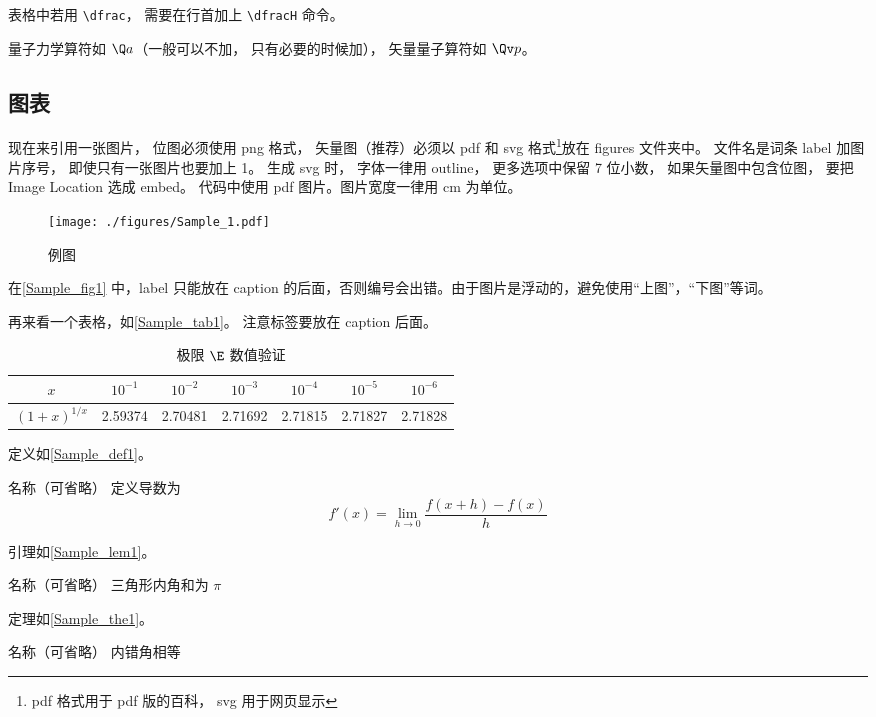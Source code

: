 表格中若用 \lstinline|\dfrac|， 需要在行首加上 \lstinline|\dfracH| 命令。%

量子力学算符如 $\Q a$（一般可以不加， 只有必要的时候加）， 矢量量子算符如 $\Qv p$。

\subsection{图表}

现在来引用一张图片， 位图必须使用 png 格式， 矢量图（推荐）必须以 pdf 和 svg 格式\footnote{pdf 格式用于 pdf 版的百科， svg 用于网页显示}放在 figures 文件夹中。 文件名是词条 label 加图片序号， 即使只有一张图片也要加上 1。 生成 svg 时， 字体一律用 outline， 更多选项中保留 7 位小数， 如果矢量图中包含位图， 要把 Image Location 选成 embed。 代码中使用 pdf 图片。图片宽度一律用 cm 为单位。
\begin{figure}[ht]
\centering
\texttt{[image: ./figures/Sample\_1.pdf]}
\caption{例图} \label{Sample_fig1}
\end{figure}
在\autoref{Sample_fig1} 中，label 只能放在 caption 的后面，否则编号会出错。由于图片是浮动的，避免使用“上图”，“下图”等词。

再来看一个表格，如\autoref{Sample_tab1}。 注意标签要放在 caption 后面。
\begin{table}[ht]
\centering
\caption{极限 $\E$ 数值验证}\label{Sample_tab1}
\begin{tabular}{|c|c|c|c|c|c|c|}
\hline
$x$ & ${10^{ - 1}}$ & ${10^{ - 2}}$ & ${10^{ - 3}}$ & ${10^{ - 4}}$ & ${10^{ - 5}}$ & ${10^{ - 6}}$ \\
\hline
$(1 + x)^{1/x}$ & 2.59374 & 2.70481 & 2.71692 & 2.71815 & 2.71827 & 2.71828 \\
\hline
\end{tabular}
\end{table}

定义如\autoref{Sample_def1}。
\begin{definition}{名称（可省略）}\label{Sample_def1}
 定义导数为
\begin{equation}
f'(x) = \lim_{h \to 0} \frac{f(x + h) - f(x)}{h}
\end{equation}
\end{definition}

引理如\autoref{Sample_lem1}。
\begin{lemma}{名称（可省略）}\label{Sample_lem1}
三角形内角和为 $\pi$
\end{lemma}

定理如\autoref{Sample_the1}。
\begin{theorem}{名称（可省略）}\label{Sample_the1}
内错角相等
\end{theorem}

